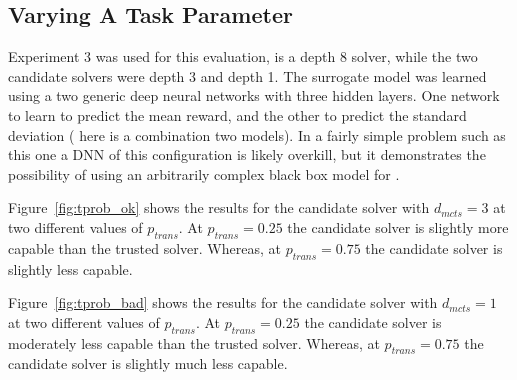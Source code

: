 \subsection{Varying A Task Parameter}
Experiment 3 was used for this evaluation, \solvestar{} is a depth 8 solver, while the two candidate solvers were depth 3 and depth 1. The surrogate model \surrogate{} was learned using a two generic deep neural networks  with three hidden layers. One network to learn to predict the mean reward, and the other to predict the standard deviation (\surrogate{} here is a combination two models). In a fairly simple problem such as this one a DNN of this configuration is likely overkill, but it demonstrates the possibility of using an arbitrarily complex black box model for \surrogate.

Figure~\ref{fig:tprob_ok} shows the results for the candidate solver with $d_{mcts}=3$ at two different values of $p_{trans}$. At $p_{trans}=0.25$ the candidate solver is slightly more capable than the trusted solver. Whereas, at $p_{trans}=0.75$ the candidate solver is slightly less capable.

Figure~\ref{fig:tprob_bad} shows the results for the candidate solver with $d_{mcts}=1$ at two different values of $p_{trans}$. At $p_{trans}=0.25$ the candidate solver is moderately less capable than the trusted solver. Whereas, at $p_{trans}=0.75$ the candidate solver is slightly much less capable.

